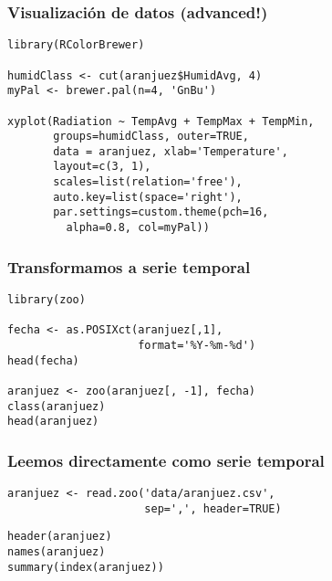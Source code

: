 \documentclass{beamer}
\begin{document}
\begin{frame}[fragile]
\frametitle{Visualización de datos (advanced!)}
\label{sec-2-4}


\lstset{language=R}
\begin{lstlisting}
library(RColorBrewer)

humidClass <- cut(aranjuez$HumidAvg, 4)
myPal <- brewer.pal(n=4, 'GnBu')

xyplot(Radiation ~ TempAvg + TempMax + TempMin,
       groups=humidClass, outer=TRUE,
       data = aranjuez, xlab='Temperature',
       layout=c(3, 1),
       scales=list(relation='free'),
       auto.key=list(space='right'),
       par.settings=custom.theme(pch=16,
         alpha=0.8, col=myPal))
\end{lstlisting}
\end{frame}
\begin{frame}[fragile]
\frametitle{Transformamos a serie temporal}
\label{sec-2-5}



\lstset{language=R}
\begin{lstlisting}
library(zoo)

fecha <- as.POSIXct(aranjuez[,1],
                    format='%Y-%m-%d')
head(fecha)

aranjuez <- zoo(aranjuez[, -1], fecha)
class(aranjuez)
head(aranjuez)
\end{lstlisting}
\end{frame}
\begin{frame}[fragile]
\frametitle{Leemos directamente como serie temporal}
\label{sec-2-6}


\lstset{language=R}
\begin{lstlisting}
aranjuez <- read.zoo('data/aranjuez.csv',
                     sep=',', header=TRUE)
\end{lstlisting}


\lstset{language=R}
\begin{lstlisting}
header(aranjuez)
names(aranjuez)
summary(index(aranjuez))
\end{lstlisting}
\end{frame}
\end{document}
